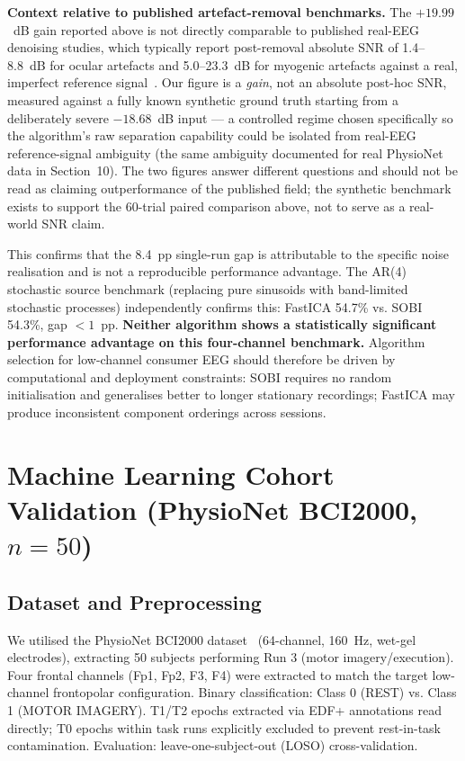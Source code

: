 \documentclass[11pt]{article}
\begin{document}
\textbf{Context relative to published artefact-removal benchmarks.} The $+19.99$~dB gain reported above is not directly comparable to published real-EEG denoising studies, which typically report post-removal absolute SNR of 1.4--8.8~dB for ocular artefacts and 5.0--23.3~dB for myogenic artefacts against a real, imperfect reference signal~\cite{placidi2018}. Our figure is a \emph{gain}, not an absolute post-hoc SNR, measured against a fully known synthetic ground truth starting from a deliberately severe $-18.68$~dB input --- a controlled regime chosen specifically so the algorithm's raw separation capability could be isolated from real-EEG reference-signal ambiguity (the same ambiguity documented for real PhysioNet data in Section~10). The two figures answer different questions and should not be read as claiming outperformance of the published field; the synthetic benchmark exists to support the 60-trial paired comparison above, not to serve as a real-world SNR claim.

This confirms that the 8.4~pp single-run gap is attributable to the specific noise realisation and is not a reproducible performance advantage. The AR(4) stochastic source benchmark (replacing pure sinusoids with band-limited stochastic processes) independently confirms this: FastICA 54.7\% vs. SOBI 54.3\%, gap $< 1$~pp. \textbf{Neither algorithm shows a statistically significant performance advantage on this four-channel benchmark.} Algorithm selection for low-channel consumer EEG should therefore be driven by computational and deployment constraints: SOBI requires no random initialisation and generalises better to longer stationary recordings; FastICA may produce inconsistent component orderings across sessions.

\section{Machine Learning Cohort Validation (PhysioNet BCI2000, $n = 50$)}

\subsection{Dataset and Preprocessing}

We utilised the PhysioNet BCI2000 dataset~\cite{schalk2004} (64-channel, 160~Hz, wet-gel electrodes), extracting 50 subjects performing Run 3 (motor imagery/execution). Four frontal channels (Fp1, Fp2, F3, F4) were extracted to match the target low-channel frontopolar configuration. Binary classification: Class 0 (REST) vs. Class 1 (MOTOR IMAGERY). T1/T2 epochs extracted via EDF+ annotations read directly; T0 epochs within task runs explicitly excluded to prevent rest-in-task contamination. Evaluation: leave-one-subject-out (LOSO) cross-validation.
\end{document}

